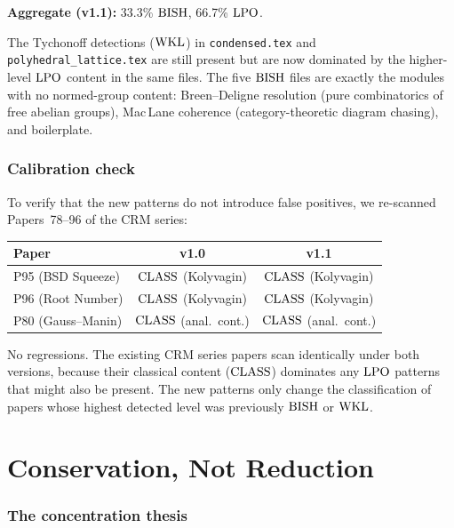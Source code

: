 \documentclass[11pt,a4paper]{article}
\theoremstyle{plain}
\theoremstyle{definition}
\newcommand{\BISH}{\textup{BISH}}
\newcommand{\WKL}{\textup{WKL}}
\newcommand{\LPO}{\textup{LPO}}
\newcommand{\CLASS}{\textup{CLASS}}
\begin{document}
\noindent\textbf{Aggregate (v1.1):} 33.3\% $\BISH$, 66.7\% $\LPO$.

The Tychonoff detections ($\WKL$) in \texttt{condensed.tex} and
\texttt{polyhedral\_lattice.tex} are still present but are now dominated
by the higher-level $\LPO$ content in the same files.  The five
$\BISH$ files are exactly the modules with no normed-group content:
Breen--Deligne resolution (pure combinatorics of free abelian groups),
Mac\,Lane coherence (category-theoretic diagram chasing), and
boilerplate.

\section{Calibration check}\label{sec:calibration}

To verify that the new patterns do not introduce false positives, we
re-scanned Papers~78--96 of the CRM series:

\begin{center}
\small
\begin{tabular}{lcc}
\toprule
\textbf{Paper} & \textbf{v1.0} & \textbf{v1.1} \\
\midrule
P95 (BSD Squeeze) & $\CLASS$ (Kolyvagin) & $\CLASS$ (Kolyvagin) \\
P96 (Root Number)  & $\CLASS$ (Kolyvagin) & $\CLASS$ (Kolyvagin) \\
P80 (Gauss--Manin) & $\CLASS$ (anal.\ cont.) & $\CLASS$ (anal.\ cont.) \\
\bottomrule
\end{tabular}
\end{center}

No regressions.  The existing CRM series papers scan identically under
both versions, because their classical content ($\CLASS$) dominates any
$\LPO$ patterns that might also be present.  The new patterns only
change the classification of papers whose highest detected level was
previously $\BISH$ or $\WKL$.


\part{Conservation, Not Reduction}\label{part:conservation}

\section{The concentration thesis}\label{sec:concentration}
\end{document}
